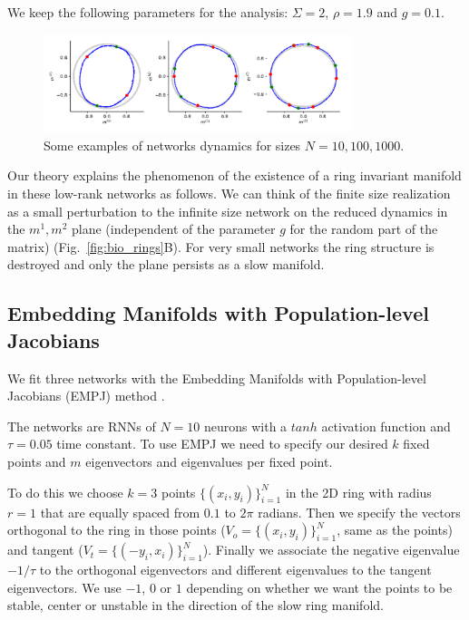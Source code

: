 \documentclass{article} %
\newcounter{ct}
\theoremstyle{definition}
\theoremstyle{remark}
\begin{document}
We keep the following parameters for the analysis:
\(\Sigma = 2\),
\(\rho = 1.9\) and
\(g=0.1\).


\begin{figure}[h]
\centering
\includegraphics[width=0.8\textwidth]{N100_si2_rho1.9_g0_fp4.8.12_s}
\caption{Some examples of networks dynamics for sizes \(N = 10, 100, 1000\).}\label{fig:low_rank_examples}
\end{figure}




Our theory explains the phenomenon of the existence of a ring invariant manifold in these low-rank networks as follows. %
We can think of the finite size realization as a small perturbation to the infinite size network on the reduced dynamics in the \(m^{1}, m^{2}\) plane (independent of the parameter \(g\) for the random part of the matrix)  (Fig.~\ref{fig:bio_rings}B).
 For very small networks the ring structure is destroyed and only the plane persists as a slow manifold.




\subsection{Embedding Manifolds with Population-level Jacobians}\label{sec:supp:empj}
We fit three networks with the Embedding Manifolds with Population-level Jacobians (EMPJ) method \citep{pollock2020}.

The networks are RNNs of \(N = 10\) neurons with a \(tanh\) activation function and \(\tau = 0.05\) time constant.
 To use EMPJ we need to specify our desired \(k\) fixed points and \(m\) eigenvectors and eigenvalues per fixed point.

To do this we choose \(k = 3\) points \(\{(x_{i}, y_{i})\}_{i = 1}^{N}\) in the 2D ring with radius \(r = 1\) that are equally spaced from \(0.1\) to \(2 \pi\) radians. Then we specify the vectors orthogonal to the ring in those points (\(V_{o} = \{(x_{i}, y_{i})\}_{i = 1}^{N}\), same as the points) and tangent (\(V_{t} = \{(-y_{i}, x_{i})\}_{i = 1}^{N}\)).
Finally we associate the negative eigenvalue \(-1/\tau\) to the orthogonal eigenvectors and different eigenvalues to the tangent eigenvectors. We use \(-1\), \(0\) or \(1\) depending on whether we want the points to be stable, center or unstable in the direction of the slow ring manifold.
\end{document}
